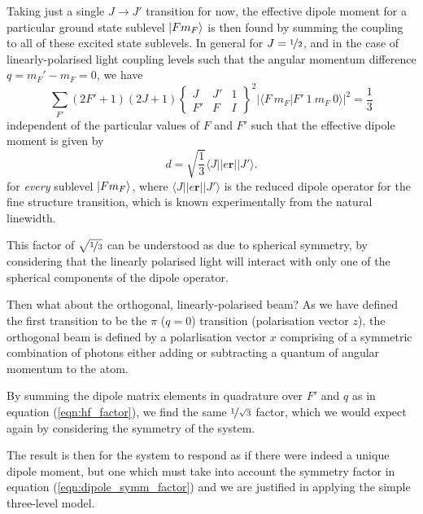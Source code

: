     Taking just a single $J \rightarrow J'$ transition for now, the effective
    dipole moment for a particular ground state sublevel $\Ket{F m_F}$ is then
    found by summing the coupling to all of these excited state sublevels. In
    general for $J = \nicefrac{1}{2}$\cite{test1}, and in the case of 
    linearly-polarised light coupling levels such that the angular momentum
    difference $q
    = m_F' - m_F = 0$, we have\cite{Steck2001}
    \begin{equation}\label{eqn:hf_factor}
      \sum_{F'} (2 F' + 1)(2 J + 1) 
        \begin{Bmatrix}
          J & J' & 1 \\[8pt]
          F' & F & I
        \end{Bmatrix}^2
        \lvert \langle F~m_F \vert F'~1~m_F~0 \rangle \rvert^2 = \frac{1}{3}
    \end{equation}
    independent of the particular values of $F$ and $F'$ such that the effective dipole moment is given by
    \begin{equation}\label{eqn:dipole_symm_factor}
      d = 
        \sqrt{\frac{1}{3}} \langle J || e \mathbf{r} || J' \rangle.
    \end{equation}
    for \textit{every} sublevel $\Ket{F m_F}$, where $\langle J || e \mathbf{r}
    || J' \rangle$ is the reduced dipole operator for the fine structure
    transition, which is known experimentally from the natural linewidth.

    This factor of $\sqrt{\nicefrac{1}{3}}$ can be understood as due to
    spherical symmetry, by considering that the linearly polarised light will
    interact with only one of the spherical components of the dipole
    operator.\cite{Steck2001}

    Then what about the orthogonal, linearly-polarised beam? As we have defined
    the first transition to be the $\pi$ ($q = 0$) transition (polarisation
    vector $z$), the orthogonal beam is defined by a polarlisation vector $x$
    comprising of a symmetric combination of photons either adding or
    subtracting a quantum of angular momentum to the atom. 

    By summing the dipole matrix elements in quadrature over $F'$ and $q$ as in
    equation (\ref{eqn:hf_factor}), we find the same $\nicefrac{1}{\sqrt{3}}$
    factor, which we would expect again by considering the symmetry of the
    system.

    The result is then for the system to respond as if there were indeed a
    unique dipole moment, but one which must take into account the symmetry
    factor in equation (\ref{eqn:dipole_symm_factor}) and we are justified in
    applying the simple three-level model.

